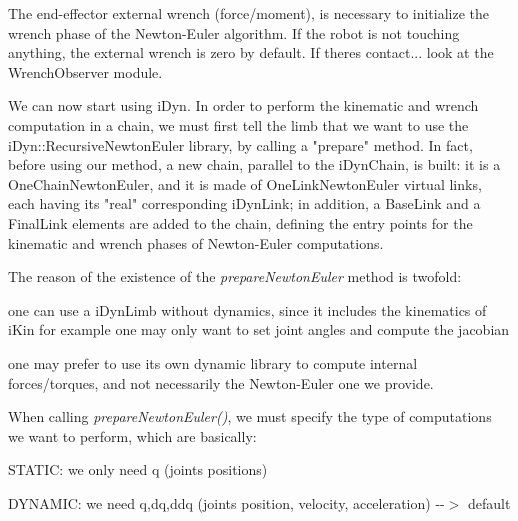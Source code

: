 \begin{DoxyCode}{0}

\end{DoxyCode}


The end-\/effector external wrench (force/moment), is necessary to initialize the wrench phase of the Newton-\/\+Euler algorithm. If the robot is not touching anything, the external wrench is zero by default. If there\textquotesingle{}s contact... look at the Wrench\+Observer module.


\begin{DoxyCode}{0}

\end{DoxyCode}


We can now start using i\+Dyn. In order to perform the kinematic and wrench computation in a chain, we must first tell the limb that we want to use the i\+Dyn\+::\+Recursive\+Newton\+Euler library, by calling a "{}prepare"{} method. In fact, before using our method, a new chain, parallel to the i\+Dyn\+Chain, is built\+: it is a One\+Chain\+Newton\+Euler, and it is made of One\+Link\+Newton\+Euler virtual links, each having its "{}real"{} corresponding i\+Dyn\+Link; in addition, a Base\+Link and a Final\+Link elements are added to the chain, defining the entry points for the kinematic and wrench phases of Newton-\/\+Euler computations.

The reason of the existence of the {\itshape prepare\+Newton\+Euler} method is twofold\+:
\begin{DoxyEnumerate}
\item one can use a i\+Dyn\+Limb without dynamics, since it includes the kinematics of i\+Kin for example one may only want to set joint angles and compute the jacobian
\item one may prefer to use its own dynamic library to compute internal forces/torques, and not necessarily the Newton-\/\+Euler one we provide.
\end{DoxyEnumerate}

When calling {\itshape prepare\+Newton\+Euler()}, we must specify the type of computations we want to perform, which are basically\+:


\begin{DoxyItemize}
\item STATIC\+: we only need q (joints positions)
\item DYNAMIC\+: we need q,dq,ddq (joints position, velocity, acceleration) -\/-\/\texorpdfstring{$>$}{>} default
\end{DoxyItemize}


